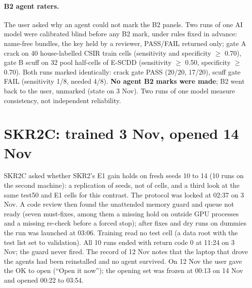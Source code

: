 \paragraph{B2 agent raters.} The user asked why an agent could not mark the B2 panels. Two runs of one AI model were calibrated
blind before any B2 mark, under rules fixed in advance: name-free bundles, the key held by a reviewer, PASS/FAIL returned only; gate
A crack on 40 house-labelled CSIR train cells (sensitivity and specificity $\geq$ 0.70), gate B scuff on 32 pool half-cells of
E-SCDD (sensitivity $\geq$ 0.50, specificity $\geq$ 0.70). Both runs marked identically: crack gate PASS (20/20, 17/20), scuff gate
FAIL (sensitivity 1/8, needed 4/8). \textbf{No agent B2 marks were made}; B2 went back to the user, unmarked (state on 3 Nov).
Two runs of one model measure consistency, not independent reliability.

\section{SKR2C: trained 3 Nov, opened 14 Nov}\label{sec:midnov-skr2c}

SKR2C asked whether SKR2's E1 gain holds on fresh seeds 10 to 14 (10 runs on the second machine): a replication of seeds, not of
cells, and a third look at the same test50 and E1 cells for this contrast. The protocol was locked at 02:37 on 3 Nov. A code review
then found the unattended memory guard and queue not ready (seven must-fixes, among them a missing hold on outside GPU processes and a
missing re-check before a forced stop); after fixes and dry runs on dummies the run was launched at 03:06. Training read no test
cell (a data root with the test list set to validation). All 10 runs ended with return code 0 at 11:24 on 3 Nov; the guard never
fired. The record of 12 Nov notes that the laptop that drove the agents had been reinstalled and no agent survived. On 12 Nov
the user gave the OK to open
(``Open it now''); the opening set was frozen at 00:13 on 14 Nov and opened 00:22 to 03:54.

